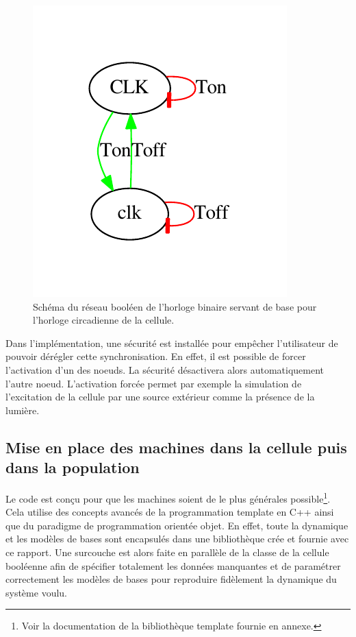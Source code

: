 \documentclass[11pt, a4paper]{article}
\begin{document}
\begin{figure}[position]
    \begin{center}
        \includegraphics[scale=1.0]{bool_net_clock}
        \caption{
            \label{net_clock}
            Schéma du réseau booléen de l'horloge binaire servant de base pour
            l'horloge circadienne de la cellule.
        }
    \end{center}
\end{figure}

Dans l'implémentation, une sécurité est installée pour empêcher l'utilisateur
de pouvoir dérégler cette synchronisation. En effet, il est possible de forcer
l'activation d'un des noeuds. La s\'ecurit\'e désactivera alors automatiquement
l'autre noeud. L'activation forcée permet par exemple la simulation de l'excitation de la
cellule par une source extérieur comme la présence de la lumière.

\subsection{Mise en place des machines dans la cellule puis dans la population}
Le code est conçu pour que les machines soient de le plus générales
possible\footnote{Voir la documentation de la bibliothèque template fournie en
annexe.}. Cela utilise des concepts avancés de la programmation template en
C++ ainsi que du paradigme de programmation orientée objet. En effet, toute la
dynamique et les modèles de bases sont encapsulés dans une bibliothèque
crée et fournie avec ce rapport. Une surcouche est alors faite en parallèle de la classe de la
cellule booléenne afin de spécifier totalement les données manquantes et de
paramétrer correctement les modèles de bases pour reproduire fidèlement la
dynamique du système voulu.
\end{document}
